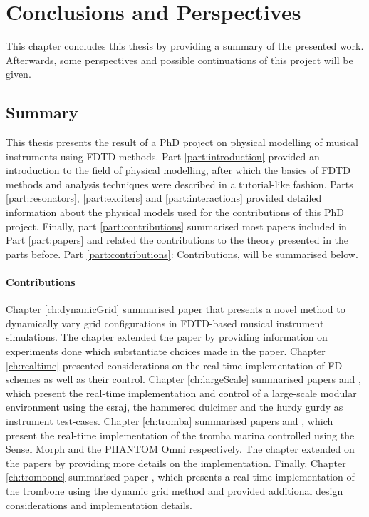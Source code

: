 \chapter{Conclusions and Perspectives}\label{ch:conclusion}
This chapter concludes this thesis by providing a summary of the presented work. Afterwards, some perspectives and possible continuations of this project will be given.


\section{Summary}
This thesis presents the result of a PhD project on physical modelling of musical instruments using FDTD methods.
Part \ref{part:introduction} provided an introduction to the field of physical modelling, after which the basics of FDTD methods and analysis techniques were described in a tutorial-like fashion. Parts \ref{part:resonators}, \ref{part:exciters} and \ref{part:interactions} provided detailed information about the physical models used for the contributions of this PhD project. Finally, part \ref{part:contributions} summarised most papers included in Part \ref{part:papers} and related the contributions to the theory presented in the parts before. Part \ref{part:contributions}: Contributions, will be summarised below.
\subsubsection{Contributions}
Chapter \ref{ch:dynamicGrid} summarised paper \citeP[G] that presents a novel method to dynamically vary grid configurations in FDTD-based musical instrument simulations. The chapter extended the paper by providing information on experiments done which substantiate choices made in the paper. 
Chapter \ref{ch:realtime} presented considerations on the real-time implementation of FD schemes as well as their control. 
Chapter \ref{ch:largeScale} summarised papers \citeP[A] and \citeP[B], which present the real-time implementation and control of a large-scale modular environment using the esraj, the hammered dulcimer and the hurdy gurdy as instrument test-cases. 
Chapter \ref{ch:tromba} summarised papers \citeP[D] and \citeP[E], which present the real-time implementation of the tromba marina controlled using the Sensel Morph and the PHANTOM Omni respectively. The chapter extended on the papers by providing more details on the implementation. Finally, Chapter \ref{ch:trombone} summarised paper \citeP[H], which presents a real-time implementation of the trombone using the dynamic grid method and provided additional design considerations and implementation details.


